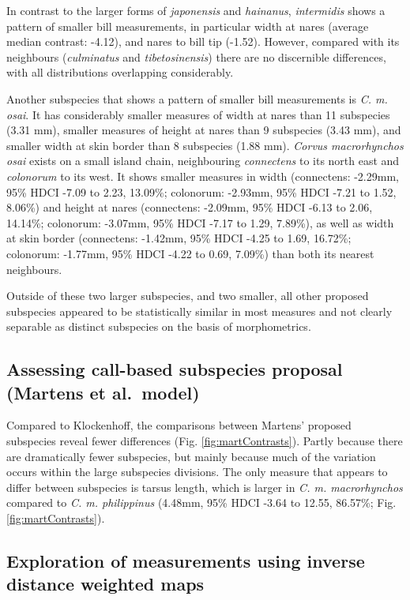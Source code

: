 \documentclass[10pt,a4paper]{article}
\begin{document}
In contrast to the larger forms of \emph{japonensis} and \emph{hainanus}, \emph{intermidis} shows a pattern of smaller bill measurements, in particular width at nares (average median contrast: -4.12), and nares to bill tip (-1.52).
However, compared with its neighbours (\emph{culminatus} and \emph{tibetosinensis}) there are no discernible differences, with all distributions overlapping considerably.

Another subspecies that shows a pattern of smaller bill measurements is \emph{C. m. osai}.
It has considerably smaller measures of width at nares than 11 subspecies (3.31 mm), smaller measures of height at nares than 9 subspecies (3.43 mm), and smaller width at skin border than 8 subspecies (1.88 mm).
\emph{Corvus macrorhynchos osai} exists on a small island chain, neighbouring \emph{connectens} to its north east and \emph{colonorum} to its west.
It shows smaller measures in width (connectens: -2.29mm, 95\% HDCI -7.09 to 2.23, 13.09\%; colonorum: -2.93mm, 95\% HDCI -7.21 to 1.52, 8.06\%) and height at nares (connectens: -2.09mm, 95\% HDCI -6.13 to 2.06, 14.14\%; colonorum: -3.07mm, 95\% HDCI -7.17 to 1.29, 7.89\%), as well as width at skin border (connectens: -1.42mm, 95\% HDCI -4.25 to 1.69, 16.72\%; colonorum: -1.77mm, 95\% HDCI -4.22 to 0.69, 7.09\%) than both its nearest neighbours.

Outside of these two larger subspecies, and two smaller, all other proposed subspecies appeared to be statistically similar in most measures and not clearly separable as distinct subspecies on the basis of morphometrics.

\subsection{Assessing call-based subspecies proposal (Martens et al.~model)}\label{assessing-call-based-subspecies-proposal-martens-et-al.-model}

Compared to Klockenhoff, the comparisons between Martens' proposed subspecies reveal fewer differences (Fig. \ref{fig:martContrasts}).
Partly because there are dramatically fewer subspecies, but mainly because much of the variation occurs within the large subspecies divisions.
The only measure that appears to differ between subspecies is tarsus length, which is larger in \emph{C. m. macrorhynchos} compared to \emph{C. m. philippinus} (4.48mm, 95\% HDCI -3.64 to 12.55, 86.57\%; Fig. \ref{fig:martContrasts}).

\subsection{Exploration of measurements using inverse distance weighted maps}\label{exploration-of-measurements-using-inverse-distance-weighted-maps}
\end{document}
